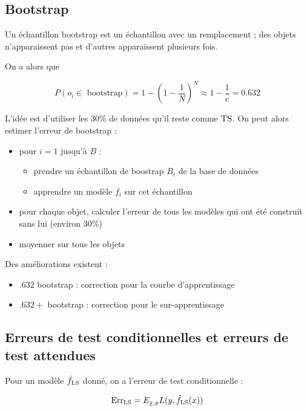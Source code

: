 	\subsection{Bootstrap}
	
	Un échantillon bootstrap est un échantillon avec un remplacement ; des objets n'apparaissent pas et d'autres apparaissent plusieurs fois.
	
	
	On a alors que
	
	$$P(o_i \in \text{ bootstrap}) = 1 - (1 - \frac{1}{N})^N \approx 1 - \frac{1}{e} = 0.632$$
	
	L'idée est d'utiliser les 30\% de données qu'il reste comme $\text{TS}$. On peut alors estimer l'erreur de bootstrap :
	
	\begin{itemize}
		\item pour $i = 1$ jusqu'à $B$ :
		
		\begin{itemize}
			\item prendre un échantillon de boostrap $B_i$ de la base de données
			\item apprendre un modèle $f_i$ sur cet échantillon
		\end{itemize}
		
		\item pour chaque objet, calculer l'erreur de tous les modèles qui ont été construit sans lui (environ 30\%)
		\item moyenner sur tous les objets
	\end{itemize}
	
	Des améliorations existent :
	
	\begin{itemize}
		\item $.632$ bootstrap : correction pour la courbe d'apprentissage
		\item $.632+$ bootstrap : correction pour le sur-apprentissage
	\end{itemize}
	
	\subsection{Erreurs de test conditionnelles et erreurs de test attendues}
	
	Pour un modèle $\hat{f}_{\text{LS}}$ donné, on a l'erreur de test conditionnelle :
	
	$$\text{Err}_{\text{LS}} = E_{\underline{x}, y}{L(y, \hat{f}_{\text{LS}}(x))}$$
	
